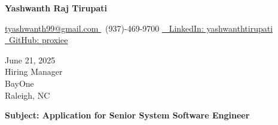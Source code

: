 \documentclass[letterpaper,11pt]{article}
\begin{document}
\begin{center}
    \textbf{\LARGE Yashwanth Raj Tirupati}
    \vspace{4pt}
    
    \small
    \href{mailto:tyashwanth99@gmail.com}{ tyashwanth99@gmail.com }\textbar
     ~(937)-469-9700 \textbar
    \href{https://linkedin.com/in/yashwanthtirupati}{~ LinkedIn: yashwanthtirupati }\textbar 
    \href{https://github.com/proxiee}{~GitHub: proxiee }
\end{center}

\vspace{20pt}

\begin{flushleft}
    June 21, 2025 \\
    \vspace{12pt}
    Hiring Manager \\
    BayOne \\
    Raleigh, NC \\
\end{flushleft}


\begin{flushleft}
\textbf{Subject: Application for Senior System Software Engineer}
\end{flushleft}


\end{document}
